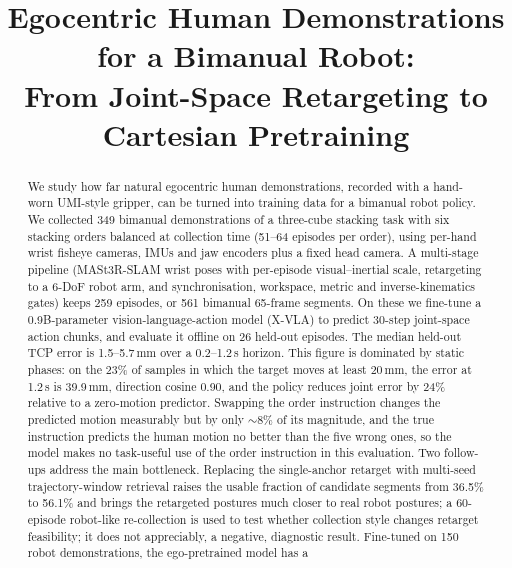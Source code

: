 \documentclass[conference,10pt]{IEEEtran}
\newcommand{\mm}{\,mm\xspace}
\begin{document}
\title{Egocentric Human Demonstrations for a Bimanual Robot:\\From Joint-Space Retargeting to Cartesian Pretraining}
\author{
}
\maketitle

\begin{abstract}
We study how far natural egocentric human demonstrations, recorded with a hand-worn UMI-style gripper, can be turned into
training data for a bimanual robot policy. We collected 349 bimanual demonstrations of a three-cube stacking task with six
stacking orders balanced at collection time (51--64 episodes per order), using per-hand wrist fisheye cameras, IMUs and jaw
encoders plus a fixed head camera. A multi-stage pipeline (MASt3R-SLAM wrist poses with per-episode visual--inertial scale,
retargeting to a 6-DoF robot arm, and synchronisation, workspace, metric and inverse-kinematics gates) keeps 259 episodes, or
561 bimanual 65-frame segments. On these we fine-tune a 0.9B-parameter vision-language-action model (X-VLA) to predict 30-step
joint-space action chunks, and evaluate it offline on 26 held-out episodes. The median held-out TCP error is 1.5--5.7\mm over a
0.2--1.2\,s horizon. This figure is dominated by static phases: on the 23\% of samples in which the target moves at least
20\mm, the error at 1.2\,s is 39.9\mm, direction cosine 0.90, and the policy reduces joint error by 24\% relative to a
zero-motion predictor. Swapping the order instruction changes the predicted motion measurably but by only ${\sim}8\%$ of its
magnitude, and the true instruction predicts the human motion no better than the five wrong ones, so the model makes no
task-useful use of the order instruction in this evaluation.
Two follow-ups address the main bottleneck. Replacing the single-anchor retarget with multi-seed trajectory-window
retrieval raises the usable fraction of candidate segments from 36.5\% to 56.1\% and brings the retargeted postures
much closer to real robot postures; a 60-episode robot-like re-collection is used to test whether collection style changes
retarget feasibility; it does not appreciably, a negative, diagnostic result. Fine-tuned on 150 robot demonstrations, the ego-pretrained model has a

\end{abstract}
\end{document}
